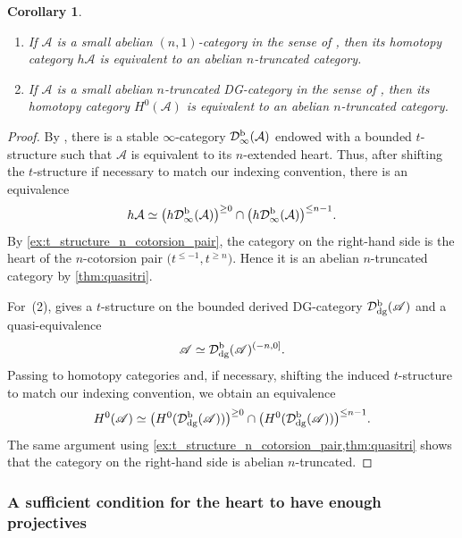 \documentclass[a4paper,reqno,10pt]{amsart}
\newtheorem{corollary}[corollary]{Corollary}
\theoremstyle{definition}
\theoremstyle{definition}
\theoremstyle{definition}
\theoremstyle{definition}
\theoremstyle{plain}
\newcommand{\dg}{{\rm dg}}
\newcommand{\Db}{\mathcal{D}^{\rm b}}
\newcommand{\A}{\mathscr{A}}
\begin{document}
\color{blue}
\begin{corollary}\label{cor:homotopy_category_abelian_truncated}
\begin{enumerate}
\item If $\mathcal{A}$ is a small abelian $(n,1)$-category in the sense of
\cite[Definition~6.2.4]{Ste23}, then its homotopy category $h\mathcal{A}$ is equivalent to an abelian $n$-truncated category.
\item If $\A$ is a small abelian $n$-truncated DG-category in the sense of
\cite[Definition~3.12]{Moc25}, then its homotopy category $H^0(\A)$ is equivalent to an abelian $n$-truncated category.
\end{enumerate}
\end{corollary}
\begin{proof}
By \cite[Theorem~6.3.2(1) and Remark~6.3.3]{Ste23}, there is a stable
$\infty$-category $\Db_\infty(\mathcal{A})$ endowed with a bounded
$t$-structure such that $\mathcal{A}$ is equivalent to its $n$-extended heart.
Thus, after shifting the $t$-structure if necessary to match our indexing
convention, there is an equivalence
\[
h\mathcal{A}\simeq
\bigl(h\Db_\infty(\mathcal{A})\bigr)^{\geq 0}
\cap
\bigl(h\Db_\infty(\mathcal{A})\bigr)^{\leq n-1}.
\]
By \cref{ex:t_structure_n_cotorsion_pair}, the category on the right-hand side
is the heart of the $n$-cotorsion pair
$\bigl(t^{\leq -1},t^{\geq n}\bigr)$.
Hence it is an abelian $n$-truncated category by \cref{thm:quasitri}.

For~{\rm (2)}, \cite[Theorem~5.4]{Plo26} gives a $t$-structure on the bounded
derived DG-category $\Db_{\dg}(\A)$ and a quasi-equivalence
\[
\A\simeq \Db_{\dg}(\A)^{(-n,0]}.
\]
Passing to homotopy categories and, if necessary, shifting the induced
$t$-structure to match our indexing convention, we obtain an equivalence
\[
H^0(\A)\simeq
\bigl(H^0(\Db_{\dg}(\A))\bigr)^{\geq 0}
\cap
\bigl(H^0(\Db_{\dg}(\A))\bigr)^{\leq n-1}.
\]
The same argument using \cref{ex:t_structure_n_cotorsion_pair,thm:quasitri}
shows that the category on the right-hand side is abelian $n$-truncated.
\end{proof}
\normalcolor


\subsubsection{A sufficient condition for the heart to have enough projectives}
\end{document}
